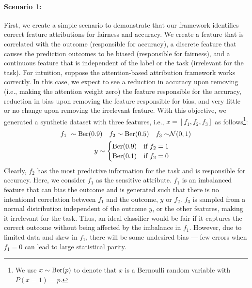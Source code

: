 \paragraph{Scenario 1:} First, we create a simple scenario to demonstrate that our framework identifies correct feature attributions for fairness and accuracy. We create a feature that is correlated with the outcome (responsible for accuracy), a discrete feature that causes the prediction outcomes to be biased (responsible for fairness), and a continuous feature that is independent of the label or the task (irrelevant for the task). For intuition, suppose the attention-based attribution framework works correctly. In this case, we expect to see a reduction in accuracy upon removing (i.e., making the attention weight zero) the feature responsible  for the accuracy, reduction in bias upon removing the feature responsible for bias, and very little or no change upon removing the irrelevant feature. With this objective, we generated a synthetic dataset with three features, i.e., $x = [f_1, f_2, f_3]$ as follows\footnote{We use $x\sim \text{Ber}(p)$ to denote that $x$  is a Bernoulli random variable with $P(x=1)=p$.}:
\begin{align*}
    f_1 ~\sim \text{Ber}(0.9)
    \quad f_2\sim \text{Ber}(0.5) 
    \quad f_3\sim &\mathcal N (0,1) \\
    \quad y\sim \begin{cases}
        \text{Ber}(0.9) & \text{if } f_2=1\\
        \text{Ber}(0.1) & \text{if } f_2=0
    \end{cases}
\end{align*}
%
Clearly, $f_2$ has the most predictive information for the task and is responsible for accuracy. Here, we consider $f_1$ as the sensitive attribute. $f_1$ is an imbalanced feature that can bias the outcome and is generated such that there is no intentional correlation between $f_1$ and the outcome, $y$ or $f_2$. $f_3$ is sampled from a normal distribution independent of the outcome $y$, or the other features, making it irrelevant for the task.
Thus, an ideal classifier would be fair if it captures the correct outcome without being affected by the imbalance in $f_1$. However, due to limited data and skew in $f_1$,  there will be some undesired bias --- few errors when $f_1=0$ can lead to large statistical parity. 


